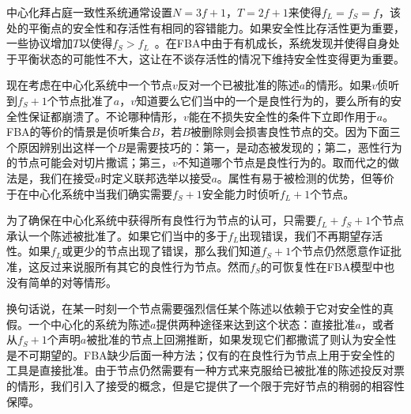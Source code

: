 中心化拜占庭一致性系统通常设置$N=3f+1$，$T=2f+1$来使得$f_L=f_S=f$，该处的平衡点的安全性和存活性有相同的容错能力。如果安全性比存活性更为重要，一些协议增加$T$以使得$f_S>f_L$~。在FBA中由于{\quorum}有机成长，系统发现并使得自身处于平衡状态的可能性不大，这让在不谈存活性的情况下维持安全性变得更为重要。

现在考虑在中心化系统中一个节点$v$反对一个已被批准的陈述$a$的情形。如果$v$侦听到$f_S+1$个节点批准了$a$，$v$知道要么它们当中的一个是良性行为的，要么所有的安全性保证都崩溃了。不论哪种情形，$v$能在不损失安全性的条件下立即作用于$a$。FBA的等价的情景是侦听集合$B$，若$B$被删除则会损害良性节点的{\quorum}交。因为下面三个原因辨别出这样一个$B$是需要技巧的：第一，{\quorum}是动态被发现的；第二，恶性行为的节点可能会对切片撒谎；第三，$v$不知道哪个节点是良性行为的。取而代之的做法是，我们在{\vblock}接受$a$时定义联邦选举以接受$a$。{\vblock}属性有易于被检测的优势，但等价于在中心化系统中当我们确实需要$f_S+1$安全能力时侦听$f_L+1$个节点。

为了确保在中心化系统中获得所有良性行为节点的认可，只需要$f_L+f_S+1$个节点承认一个陈述被批准了。如果它们当中的多于$f_L$出现错误，我们不再期望存活性。如果$f_L$或更少的节点出现了错误，那么我们知道$f_S+1$个节点仍然愿意作证批准，这反过来说服所有其它的良性行为节点。然而$f_S$的可恢复性在FBA模型中也没有简单的对等情形。

换句话说，在某一时刻一个节点需要强烈信任某个陈述以依赖于它对安全性的真假。一个中心化的系统为陈述$a$提供两种途径来达到这个状态：直接批准$a$，或者从$f_S+1$个声明$a$被批准的节点上回溯推断，如果发现它们都撒谎了则认为安全性是不可期望的。FBA缺少后面一种方法；仅有的在良性行为节点上用于安全性的工具是直接批准。由于节点仍然需要有一种方式来克服给已被批准的陈述投反对票的情形，我们引入了接受的概念，但是它提供了一个限于完好节点的稍弱的相容性保障。
